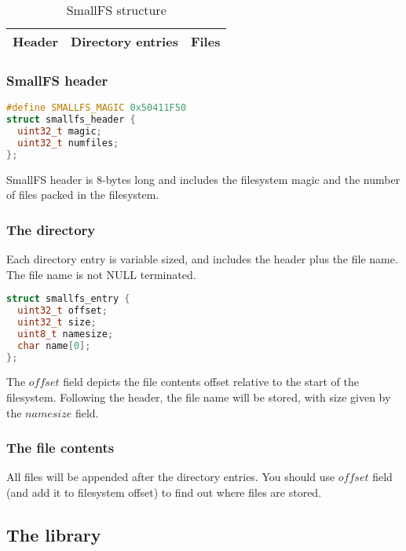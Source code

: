 \begin{table}[H]
\begin{center}
\begin{tabularx}{14cm}{cXX}
\hline
\multicolumn{1}{|c|}{Header} &
\multicolumn{1}{|X|}{Directory entries} &
\multicolumn{1}{|X|}{Files} \\
\hline
\end{tabularx}
\caption{SmallFS structure}
\end{center}
\end{table}

\subsubsection{SmallFS header}

\begin{lstlisting}[language=C++]
#define SMALLFS_MAGIC 0x50411F50
struct smallfs_header {
  uint32_t magic;
  uint32_t numfiles;
};
\end{lstlisting}

SmallFS header is 8-bytes long and includes the filesystem magic and the number of
files packed in the filesystem.

\subsubsection{The directory}

Each directory entry is variable sized, and includes the header plus the file name. The file name is not
NULL terminated.

\begin{lstlisting}[language=C++]
struct smallfs_entry {
  uint32_t offset;
  uint32_t size;
  uint8_t namesize;
  char name[0];
};
\end{lstlisting}

The $offset$ field depicts the file contents offset relative to the start of the filesystem.
Following the header, the file name will be stored, with size given by the $namesize$ field.

\subsubsection{The file contents}

All files will be appended after the directory entries. You should use $offset$ field (and add it to 
filesystem offset) to find out where files are stored.

\subsection{The library}

